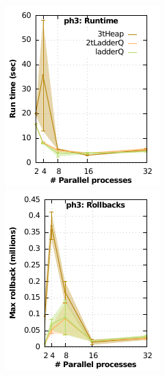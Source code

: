 \begin{figure}
  \begin{minipage}{0.49\linewidth}
    \includegraphics[width=\linewidth]{images/ph3_Delay_1_Evt_2_run_time}
  \end{minipage}
  \begin{minipage}{0.49\linewidth}
    \includegraphics[width=\linewidth]{images/ph3_Delay_1_Evt_2_rollbacks}

\end{minipage}
\end{figure}
